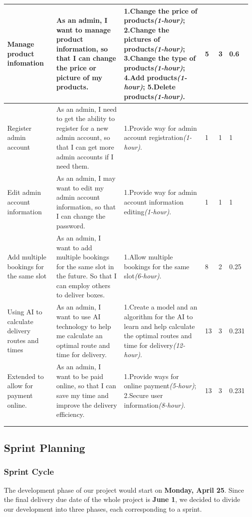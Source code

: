 \documentclass{report}
\begin{document}
\begin{tabularx}{\linewidth}{%
  >{\raggedright\arraybackslash}p{1.5cm}%
  >{\raggedright\arraybackslash}X%
  >{\raggedright\arraybackslash}X%
  p{1cm}p{1cm}p{1cm}
  }
  \midrule
  Manage product infomation
  & As an admin, I want to manage product information, so that I can change the price or picture of my products.
  & 1.Change the price of products\textit{(1-hour)}; 2.Change the pictures of products\textit{(1-hour)}; 3.Change the type of products\textit{(1-hour)}; 4.Add products\textit{(1-hour)}; 5.Delete products\textit{(1-hour)}.
  & 5
  & 3
  & 0.6
  \\
  \midrule
  Register admin account
  & As an admin, I need to get the ability to register for a new admin account, so that I can get more admin accounts if I need them.
  & 1.Provide way for admin account registration\textit{(1-hour)}.
  & 1
  & 1
  & 1
  \\
  \midrule
  Edit admin account information
  & As an admin, I may want to edit my admin account information, so that I can change the password.
  & 1.Provide way for admin account information editing\textit{(1-hour)}.
  & 1
  & 1
  & 1
  \\
  \midrule
  Add multiple bookings for the same slot
  & As an admin, I want to add multiple bookings for the same slot in the future. So that I  can employ others to deliver boxes.
  & 1.Allow multiple bookings for the same slot\textit{(6-hour)}.
  & 8
  & 2
  & 0.25
  \\
  \midrule
  Using AI to calculate delivery routes and times
  & As an admin, I want to use AI technology to help me calculate an optimal route and time for delivery.
  & 1.Create a model and an algorithm for the AI to learn and help calculate the optimal routes and time for delivery\textit{(12-hour)}.
  & 13
  & 3
  & 0.231
  \\
  \midrule
  Extended to allow for payment online.
  & As an admin, I want to be paid online, so that I can save my time and improve the delivery efficiency.
  & 1.Provide ways for online payment\textit{(5-hour)}; 2.Secure user information\textit{(8-hour)}.
  & 13
  & 3
  & 0.231
  \\
  \bottomrule
  \\
  \caption{Product Backlog}  
  \label{tab:productBacklog}
\end{tabularx}  

\subsection{Sprint Planning}

\subsubsection{Sprint Cycle}
\label{sec:sprintCycle}
The development phase of our project would start on \textbf{Monday, April 25}. Since the final delivery due date of the whole project is \textbf{June 1}, we decided to divide our development into three phases, each corresponding to a sprint.
\end{document}

